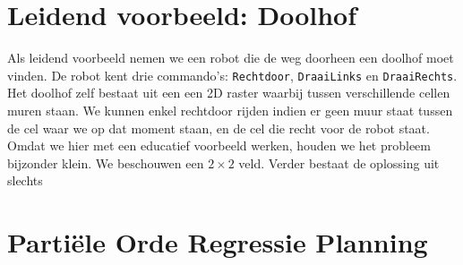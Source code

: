 \section{Leidend voorbeeld: Doolhof}
Als leidend voorbeeld nemen we een robot die de weg doorheen een doolhof moet vinden. De robot kent drie commando's: \texttt{Rechtdoor}, \texttt{DraaiLinks} en \texttt{DraaiRechts}. Het doolhof zelf bestaat uit een een 2D raster waarbij tussen verschillende cellen muren staan. We kunnen enkel rechtdoor rijden indien er geen muur staat tussen de cel waar we op dat moment staan, en de cel die recht voor de robot staat. Omdat we hier met een educatief voorbeeld werken, houden we het probleem bijzonder klein. We beschouwen een $2\times 2$ veld. Verder bestaat de oplossing uit slechts 
\section{Parti\"ele Orde Regressie Planning}
